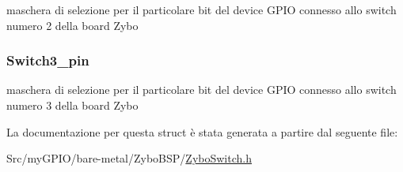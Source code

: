 maschera di selezione per il particolare bit del device G\+P\+I\+O connesso allo switch numero 2 della board Zybo \hypertarget{struct_zybo_switch__t_ab2ea73dda75022931396b29e1c377cfb}{
\subsubsection[{Switch3\+\_\+pin}]{ Switch3\+\_\+pin}}\label{struct_zybo_switch__t_ab2ea73dda75022931396b29e1c377cfb}
maschera di selezione per il particolare bit del device G\+P\+I\+O connesso allo switch numero 3 della board Zybo 

La documentazione per questa struct è stata generata a partire dal seguente file\+:\begin{DoxyCompactItemize}
\item 
Src/my\+G\+P\+I\+O/bare-\/metal/\+Zybo\+B\+S\+P/\hyperlink{_zybo_switch_8h}{Zybo\+Switch.\+h}\end{DoxyCompactItemize}

